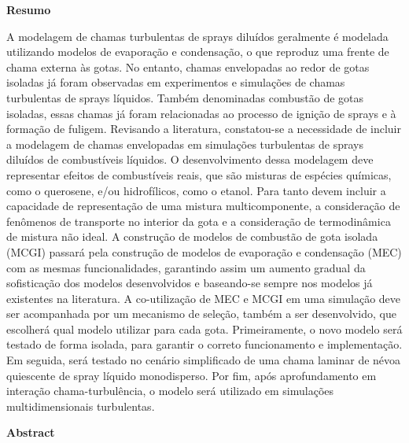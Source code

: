 
\vspace{2cm}

{ \Large \textbf{Resumo}}

\vspace{0.8cm}

{

\noindent
A modelagem de chamas turbulentas de sprays diluídos geralmente é modelada utilizando modelos de evaporação e condensação, o que reproduz uma frente de chama externa às gotas.
No entanto, chamas envelopadas ao redor de gotas isoladas já foram observadas em experimentos e simulações de chamas turbulentas de sprays líquidos.
Também denominadas combustão de gotas isoladas, essas chamas já foram relacionadas ao processo de ignição de sprays e à formação de fuligem.
Revisando a literatura, constatou-se a necessidade de incluir a modelagem de chamas envelopadas em simulações turbulentas de sprays diluídos de combustíveis líquidos.
O desenvolvimento dessa modelagem deve representar efeitos de combustíveis reais, que são misturas de espécies químicas, como o querosene, e/ou hidrofílicos, como o etanol.
Para tanto devem incluir a capacidade de representação de uma mistura multicomponente, a consideração de fenômenos de transporte no interior da gota e a consideração de termodinâmica de mistura não ideal.
A construção de modelos de combustão de gota isolada (MCGI) passará pela construção de modelos de evaporação e condensação (MEC) com as mesmas funcionalidades, garantindo assim um aumento gradual da sofisticação dos modelos desenvolvidos e baseando-se sempre nos modelos já existentes na literatura.
A co-utilização de MEC e MCGI em uma simulação deve ser acompanhada por um mecanismo de seleção, também a ser desenvolvido, que escolherá qual modelo utilizar para cada gota.
Primeiramente, o novo modelo será testado de forma isolada, para garantir o correto funcionamento e implementação. 
Em seguida, será testado no cenário simplificado de uma chama laminar de névoa quiescente de spray líquido monodisperso.
Por fim, após aprofundamento em interação chama-turbulência, o modelo será utilizado em simulações multidimensionais turbulentas.

}
\vspace{1cm}

{ \Large \textbf{Abstract}}

\vspace{0.8cm}

